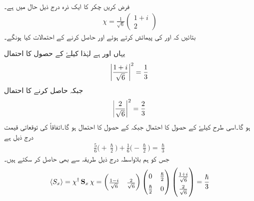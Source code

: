 فرض کریں  چکر کا ایک ذرہ درج ذیل حال میں ہے۔
\begin{align*} 
 \chi=\frac{1}{\sqrt{6}}\begin{pmatrix} 1+i \\ 2 \end{pmatrix} 
 \end{align*}
بتائیں کہ  اور  کی پیمائش کرتے ہوئے  اور  حاصل کرنے کے احتمالات کیا ہونگے۔


\quad
یہاں  اور  ہے لہٰذا  کیلۓ  کے حصول کا احتمال
\begin{align*}
 \abs{\frac{1+i}{\sqrt{6}}}^2=\frac{1}{3} 
\end{align*}
 جبکہ  حاصل کرنے کا احتمال
 \begin{align*}
 \abs{\frac{2}{\sqrt{6}}}^2 =\frac{2}{3} 
 \end{align*}
 ہو گا۔اسی طرح  کیلۓ  کے حصول کا احتمال  جبکہ  کے حصول کا احتمال
  ہو گا۔اتفاقاً  کی توقعاتی قیمت درج ذیل ہے
\begin{align*} 
 \frac{5}{6}\big(+\frac{\hslash}{2}\big)+\frac{1}{6}\big(-\frac{\hslash}{2}\big)=\frac{\hslash}{3} 
 \end{align*}
جس کو ہم بلاواسطہ درج ذیل طریقہ سے بھی حاصل کر سکتے ہیں۔
\begin{align*} 
\renewcommand{\arraystretch}{1.5}
 \langle S_{x}\rangle=\chi^{\dagger}\mat{S}_{x}\chi=\begin{pmatrix}\frac{1-i}{\sqrt{6}} & \frac{2}{\sqrt{6}} \end{pmatrix} \begin{pmatrix} 0&\tfrac{\hslash}{2} \\ \tfrac{\hslash}{2}&0 \end{pmatrix} \begin{pmatrix}\tfrac{1+i}{\sqrt{6}} \\ \tfrac{2}{\sqrt{6}}\end{pmatrix} =\frac{\hslash}{3}
 \end{align*} 


